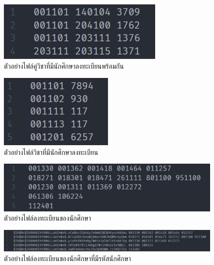 \begin{figure}
    \begin{center}
      \includegraphics[]{images/conflicts1.png}
    \end{center}
    \caption[ตัวอย่างไฟล์คู่วิชาที่มีนักศึกษาลงทะเบียนพร้อมกัน]{ตัวอย่างไฟล์คู่วิชาที่มีนักศึกษาลงทะเบียนพร้อมกัน}
    \label{fig:conflicts}     
\end{figure}
\begin{figure}
    \begin{center}
      \includegraphics[]{images/courses1.png}
    \end{center}
    \caption[ตัวอย่างไฟล์วิชาที่มีนักศึกษาลงทะเบียน]{ตัวอย่างไฟล์วิชาที่มีนักศึกษาลงทะเบียน}
    \label{fig:courses}     
\end{figure}
\begin{figure}
    \begin{center}
      \includegraphics[]{images/regist1.png}
    \end{center}
    \caption[ตัวอย่างไฟล์ลงทะเบียนของนักศึกษา]{ตัวอย่างไฟล์ลงทะเบียนของนักศึกษา}
    \label{fig:regist}     
\end{figure}
\begin{figure}
    \begin{center}
      \includegraphics[width=\linewidth]{images/regist_hashed.png}
    \end{center}
    \caption[ตัวอย่างไฟล์ลงทะเบียนของนักศึกษาที่มีรหัสนักศึกษา]{ตัวอย่างไฟล์ลงทะเบียนของนักศึกษาที่มีรหัสนักศึกษา}
    \label{fig:regist_hashed}     
\end{figure}


